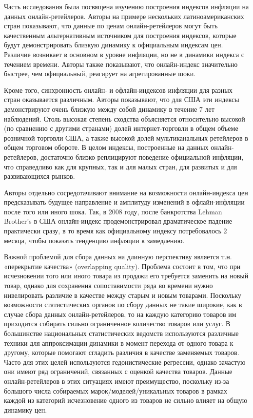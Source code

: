 Часть исследования \cite{cavallo2016billion} была посвящена изучению построения индексов инфляции на данных онлайн-ретейлеров. Авторы на примере нескольких латиноамериканских стран показывают, что данные по ценам онлайн-ретейлеров могут быть качественным альтернативным источником для построения индексов, которые будут демонстрировать близкую динамику к официальным индексам цен. Различие возникает в основном в уровне инфляции, но не в динамики индекса с течением времени. Авторы также показывают, что онлайн-индекс значительно быстрее, чем официальный, реагирует на агрегированные шоки.

Кроме того, синхронность онлайн- и офлайн-индексов инфляции для разных стран оказывается различным. Авторы показывают, что для США эти индексы демонстрируют очень близкую между собой динамику в течение 7 лет наблюдений. Столь высокая степень сходства объясняется относительно высокой (по сравнению с другими странами) долей интернет-торговли в общем объеме розничной торговли США, а также высокой долей мультиканальных ретейлеров в общем торговом обороте. В целом индексы, построенные на данных онлайн-ретейлеров, достаточно близко реплицируют поведение официальной инфляции, что справедливо как для крупных, так и для малых стран, для развитых и для развивающихся рынков.

Авторы отдельно сосредотачивают внимание на возможности онлайн-индекса цен предсказывать будущее направление и амплитуду изменений в офлайн-инфляции после того или иного шока. Так, в 2008 году, после банкротства Lehman Brother’s в США онлайн-индекс продемонстрировал драматическое падение практически сразу, в то время как официальному индексу потребовалось 2 месяца, чтобы показать тенденцию инфляции к замедлению.

Важной проблемой для сбора данных на длинную перспективу является т.н. «перекрытие качества» (overlapping quality). Проблема состоит в том, что при исчезновении того или иного товара из продажи его требуется заменить на новый товар, однако для сохранения сопоставимости ряда во времени нужно нивелировать различие в качестве между старым и новым товарами. Поскольку возможности статистических органов по сбору данных не такие широкие, как в случае сбора данных онлайн-ретейлеров, то на каждую категорию товаров им приходится собирать сильно ограниченное количество товаров или услуг. В большинстве национальных статистических ведомств используются различные техники для аппроксимации динамики в момент перехода от одного товара к другому, которые помогают сгладить различия в качестве заменяемых товаров. Часто для этих целей используются гедонистические регрессии, однако зачастую они имеют ряд ограничений, связанных с оценкой качества товаров. Данные онлайн-ретейлеров в этих ситуациях имеют преимущество, поскольку из-за большого числа собираемых марок/моделей/уникальных товаров в рамках каждой из категорий исчезновение одного из товаров не сильно влияет на общую динамику цен. 

